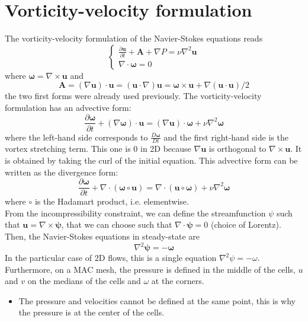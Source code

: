 \documentclass[12pt, openany]{report}
\theoremstyle{definition}
\begin{document}
\section{Vorticity-velocity formulation}
The vorticity-velocity formulation of the Navier-Stokes equations reads
\begin{equation}
	\begin{cases}
		\frac{\partial \boldsymbol{u}}{\partial t} + \boldsymbol{A} + \nabla P = \nu \nabla^2 \boldsymbol{u}\\
		\nabla \cdot \boldsymbol{\omega} = 0
	\end{cases}
\end{equation}
where $\boldsymbol{\omega} = \nabla \times \boldsymbol{u}$ and 
\begin{equation}
	\boldsymbol{A} = (\nabla \boldsymbol{u})\cdot \boldsymbol{u} = (\boldsymbol{u}\cdot \nabla)\boldsymbol{u} = \boldsymbol{\omega} \times \boldsymbol{u} + \nabla (\boldsymbol{u}\cdot \boldsymbol{u})/2
\end{equation}
the two first forms were already used previously. The vorticity-velocity formulation has an advective form:
\begin{equation}
	\frac{\partial \boldsymbol{\omega}}{\partial t} + (\nabla \boldsymbol{\omega}) \cdot \boldsymbol{u} = (\nabla \boldsymbol{u}) \cdot \boldsymbol{\omega} + \nu \nabla^2 \boldsymbol{\omega}
\end{equation}
where the left-hand side corresponds to $\frac{D\boldsymbol{\omega}}{Dt}$ and the first right-hand side is the vortex stretching term. This one is 0 in 2D because $\nabla \boldsymbol{u}$ is orthogonal to $\nabla \times \boldsymbol{u}$. It is obtained by taking the curl of the initial equation. This advective form can be written as the divergence form:
\begin{equation}
	\frac{\partial\boldsymbol{\omega}}{\partial t} + \nabla\cdot (\boldsymbol{\omega} \circ \boldsymbol{u}) = \nabla \cdot (\boldsymbol{u}\circ \boldsymbol{\omega}) + \nu \nabla^2 \boldsymbol{\omega}
\end{equation} 
where $\circ$ is the Hadamart product, i.e. elementwise. \\
From the incompressibility constraint, we can define the streamfunction $\psi$ such that $\boldsymbol{u} = \nabla \times \boldsymbol{\psi}$, that we can choose such that $\nabla \cdot \boldsymbol{\psi}=0$ (choice of Lorentz). Then, the Navier-Stokes equations in steady-state are 
\begin{equation}
	\nabla^2\boldsymbol{\psi} = -\boldsymbol{\omega}
\end{equation}
In the particular case of 2D flows, this is a single equation $\nabla^2 \psi = -\omega$. Furthermore, on a MAC mesh, the pressure is defined in the middle of the cells, $u$ and $v$ on the medians of the cells and $\omega$ at the corners. 
\begin{itemize}
	\item [$\to$] The pressure and velocities cannot be defined at the same point, this is why the pressure is at the center of the cells.
\end{itemize}
\end{document}
